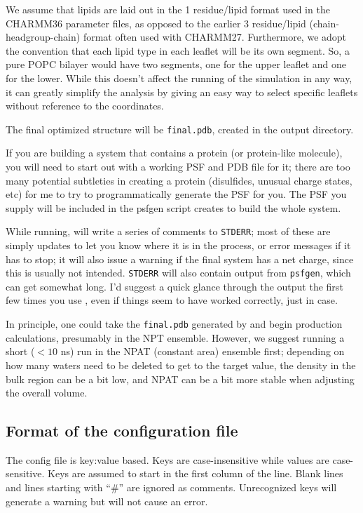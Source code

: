 \documentclass[12pt]{article}
\begin{document}
We assume that lipids are laid out in the 1 residue/lipid format 
used in the CHARMM36 parameter files, as opposed to the earlier 3
residue/lipid (chain-headgroup-chain) format often used with CHARMM27.
Furthermore, we adopt the convention that each lipid type in each leaflet
will be its own segment.  So, a pure POPC bilayer would have two segments,
one for the upper leaflet and one for the lower.  While this doesn't affect
the running of the simulation in any way, it can greatly simplify the
analysis by giving an easy way to select specific leaflets without reference
to the coordinates.

The final optimized structure will be {\tt final.pdb}, created in the output
directory.

If you are building a system that contains a protein (or protein-like
molecule), you will need to start out with a working PSF and PDB file for
it; there are too many potential subtleties in creating a protein
(disulfides, unusual charge states, etc) for me to try to programmatically
generate the PSF for you.  The PSF you supply will be included in the
psfgen script {\omgwtf} creates to build the whole system.

While running, {\omgwtf} will write a series of comments to {\tt STDERR};
most of these are simply updates to let you know where it is in the
process, or error messages if it has to stop; it will also issue a warning
if the final system has a net charge, since this is usually not intended.
{\tt STDERR} will also contain output from {\tt psfgen}, which can get
somewhat long.  I'd suggest a quick glance through the output the first few
times you use {\omgwtf}, even if things seem to have worked correctly, just
in case.

In principle, one could take the {\tt final.pdb} generated by {\omgwtf} and
begin production calculations, presumably in the NPT ensemble.  However, we
suggest running a short ($<10$ ns) run in the NPAT (constant area) ensemble
first; depending on how many waters need to be deleted to get to the target
value, the density in the bulk region can be a bit low, and NPAT can be a
bit more stable when adjusting the overall volume.  

\subsection{Format of the configuration file}
\label{ss:config}

The config file is key:value based.  Keys are case-insensitive while values
are case-sensitive.  Keys are assumed to start in the first column of the
line.  Blank lines and lines starting with ``\#'' are ignored as comments.
Unrecognized keys will generate a warning but will not cause an error.
\end{document}
